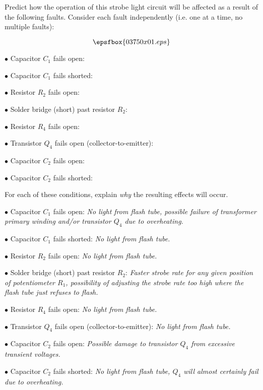 

Predict how the operation of this strobe light circuit will be affected as a result of the following faults.  Consider each fault independently (i.e. one at a time, no multiple faults):

$$\epsfbox{03750x01.eps}$$

\medskip
\item{$\bullet$} Capacitor $C_1$ fails open:
\vskip 5pt
\item{$\bullet$} Capacitor $C_1$ fails shorted:
\vskip 5pt
\item{$\bullet$} Resistor $R_2$ fails open:
\vskip 5pt
\item{$\bullet$} Solder bridge (short) past resistor $R_2$:
\vskip 5pt
\item{$\bullet$} Resistor $R_4$ fails open:
\vskip 5pt
\item{$\bullet$} Transistor $Q_4$ fails open (collector-to-emitter):
\vskip 5pt
\item{$\bullet$} Capacitor $C_2$ fails open:
\vskip 5pt
\item{$\bullet$} Capacitor $C_2$ fails shorted:
\medskip

For each of these conditions, explain {\it why} the resulting effects will occur.







\medskip
\item{$\bullet$} Capacitor $C_1$ fails open: {\it No light from flash tube, possible failure of transformer primary winding and/or transistor $Q_4$ due to overheating.}
\vskip 5pt
\item{$\bullet$} Capacitor $C_1$ fails shorted: {\it No light from flash tube.}
\vskip 5pt
\item{$\bullet$} Resistor $R_2$ fails open: {\it No light from flash tube.}
\vskip 5pt
\item{$\bullet$} Solder bridge (short) past resistor $R_2$: {\it Faster strobe rate for any given position of potentiometer $R_1$, possibility of adjusting the strobe rate too high where the flash tube just refuses to flash.}
\vskip 5pt
\item{$\bullet$} Resistor $R_4$ fails open: {\it No light from flash tube.}
\vskip 5pt
\item{$\bullet$} Transistor $Q_4$ fails open (collector-to-emitter): {\it No light from flash tube.}
\vskip 5pt
\item{$\bullet$} Capacitor $C_2$ fails open: {\it Possible damage to transistor $Q_4$ from excessive transient voltages.}
\vskip 5pt
\item{$\bullet$} Capacitor $C_2$ fails shorted: {\it No light from flash tube, $Q_4$ will almost certainly fail due to overheating.}
\medskip

